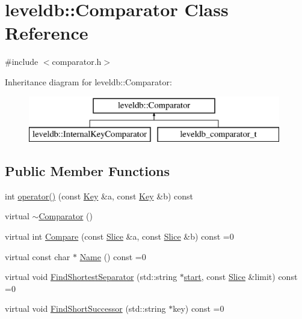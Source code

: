 \hypertarget{structleveldb_1_1_comparator}{}\section{leveldb\+:\+:Comparator Class Reference}
\label{structleveldb_1_1_comparator}


{\ttfamily \#include $<$comparator.\+h$>$}

Inheritance diagram for leveldb\+:\+:Comparator\+:\begin{figure}[H]
\begin{center}
\leavevmode
\includegraphics[height=2.000000cm]{structleveldb_1_1_comparator}
\end{center}
\end{figure}
\subsection*{Public Member Functions}
\begin{DoxyCompactItemize}
\item 
int \hyperlink{structleveldb_1_1_comparator_a2c2009828869475d8375c84d65cf1c24}{operator()} (const \hyperlink{namespaceleveldb_a7e9a9725b13fa0bd922d885280dfab95}{Key} \&a, const \hyperlink{namespaceleveldb_a7e9a9725b13fa0bd922d885280dfab95}{Key} \&b) const 
\item 
virtual \hyperlink{structleveldb_1_1_comparator_a88fe2a99620c746932a8ef3ee46e8960}{$\sim$\+Comparator} ()
\item 
virtual int \hyperlink{structleveldb_1_1_comparator_a05dae6edcad3c7db23827c0233d74039}{Compare} (const \hyperlink{classleveldb_1_1_slice}{Slice} \&a, const \hyperlink{classleveldb_1_1_slice}{Slice} \&b) const =0
\item 
virtual const char $\ast$ \hyperlink{structleveldb_1_1_comparator_a888b039bdd6d59517dca75fb40721f5e}{Name} () const =0
\item 
virtual void \hyperlink{structleveldb_1_1_comparator_abdfe6076225e95b91ffd94f646063115}{Find\+Shortest\+Separator} (std\+::string $\ast$\hyperlink{db__bench_8cc_ab376b87f96a574a793c03c53e75afec8}{start}, const \hyperlink{classleveldb_1_1_slice}{Slice} \&limit) const =0
\item 
virtual void \hyperlink{structleveldb_1_1_comparator_a49751dd906595633161dfad943d24b3b}{Find\+Short\+Successor} (std\+::string $\ast$key) const =0
\end{DoxyCompactItemize}


